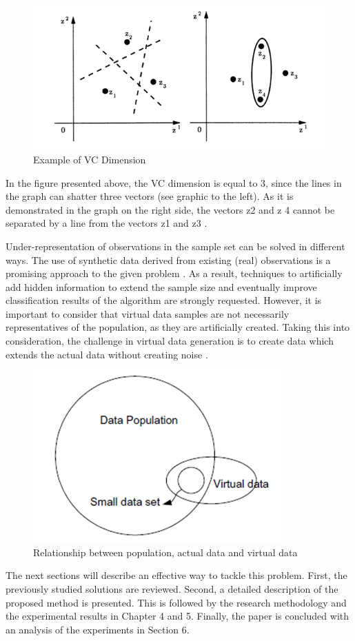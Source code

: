 \documentclass[parskip=full]{scrartcl}
\begin{document}
\begin{figure}[H]
	\centering
	\includegraphics[width=0.6\linewidth]{"./resources/vc_dimension"}
	\caption{Example of VC Dimension \cite{Vapnik.2008}}
	\label{fig:vc-dimension}
\end{figure}

In the figure presented above, the VC dimension is equal to 3, since the lines
in the graph can shatter three vectors (see graphic to the left). As it is
demonstrated in the graph on the right side, the vectors z{\tiny 2} and z{\tiny
4} cannot be separated by a line from the vectors z{\tiny 1} and z{\tiny 3}
\cite{Vapnik.2008}.

Under-representation of observations in the sample set can be solved in different ways. The use of synthetic data derived from existing (real) observations is a promising approach to the given problem \cite{Sezer.2014}. As a result, techniques to artificially add hidden information to extend the sample size and eventually improve classification results of the algorithm are strongly requested. However, it is important to consider that virtual data samples are not necessarily representatives of the population, as they are artificially created. Taking this into consideration, the challenge in virtual data generation is to create data which extends the actual data without creating noise \cite{Li.2006}. 

\begin{figure}[H]
	\centering
	\includegraphics[width=0.35\linewidth]{./Resources/relationship}
	\caption{Relationship between population, actual data and virtual data \cite{Li.2006}}
	\label{fig:relationship}
\end{figure}

The next sections will describe an effective way to tackle this problem. First,
the previously studied solutions are reviewed. Second, a detailed description of the proposed method is presented. This is followed by the research methodology and the experimental results in Chapter 4 and 5. Finally, the paper is concluded with an analysis of the experiments in Section 6.
\end{document}
